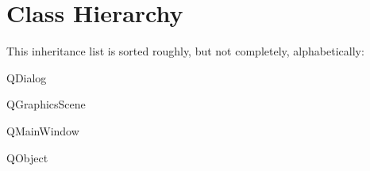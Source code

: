 \section{Class Hierarchy}
This inheritance list is sorted roughly, but not completely, alphabetically\+:\begin{DoxyCompactList}
\item {}
\item Q\+Dialog\begin{DoxyCompactList}
\item {}
\item {}
\end{DoxyCompactList}
\item Q\+Graphics\+Scene\begin{DoxyCompactList}
\item {}
\end{DoxyCompactList}
\item Q\+Main\+Window\begin{DoxyCompactList}
\item {}
\end{DoxyCompactList}
\item Q\+Object\begin{DoxyCompactList}
\item {}
\item {}
\end{DoxyCompactList}
\end{DoxyCompactList}
